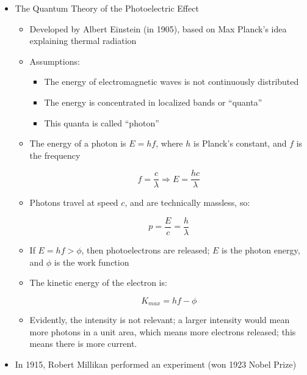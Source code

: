\begin{itemize}
  \item The Quantum Theory of the Photoelectric Effect

    \begin{itemize}

      \item Developed by Albert Einstein (in 1905), based on Max Planck's idea explaining thermal radiation

      \item Assumptions:

        \begin{itemize}

          \item The energy of electromagnetic waves is not continuously distributed

          \item The energy is concentrated in localized bands or ``quanta''

          \item This quanta is called ``photon''

        \end{itemize}

      \item The energy of a photon is $\boxed{E=hf}$, where $h$ is Planck's constant, and $f$ is the frequency

        $$\boxed{f=\frac{c}{\lambda}\Rightarrow E=\frac{hc}{\lambda}}$$

      \item Photons travel at speed $c$, and are technically massless, so:

        $$\boxed{p=\frac{E}{c}=\frac{h}{\lambda}}$$

      \item If $E=hf>\phi$, then photoelectrons are released; $E$ is the photon energy, and $\phi$ is the work function

      \item The kinetic energy of the electron is:

        $$\boxed{K_{max}=hf-\phi}$$

      \item Evidently, the intensity is not relevant; a larger intensity would mean more photons in a unit area, which means more electrons released; this means there is more current.

    \end{itemize}

  \item In 1915, Robert Millikan performed an experiment (won 1923 Nobel Prize)


\end{itemize}
